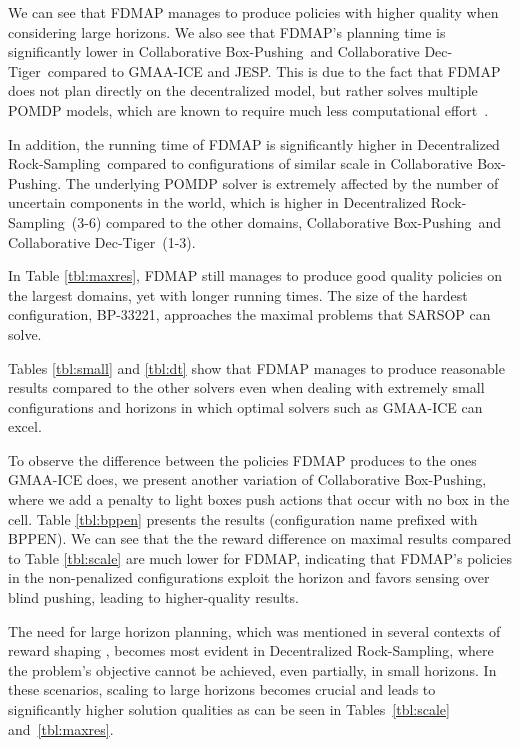 \documentclass[letterpaper]{article}
\theoremstyle{definition}
\newcommand{\eliran}[1]{\textbf{[\color{red}ELIRAN:#1]}}
\newcommand{\ronen}[1]{\textbf{[\color{blue}RONEN:#1]}}
\newcommand{\cbp}[0]{Collaborative Box-Pushing}
\newcommand{\cdt}[0]{Collaborative Dec-Tiger}
\newcommand{\drs}[0]{Decentralized Rock-Sampling}
\begin{document}
We can see that FDMAP manages to produce policies with higher quality when considering large horizons. We also see that FDMAP's planning time is
significantly lower in \cbp\ and \cdt\ compared to GMAA-ICE and JESP.  This is due to the fact that FDMAP does not plan directly on the decentralized model, but rather solves multiple POMDP models, which are known to require much less computational effort~\cite{DECPOMDPCOMP}.

In addition, the running time of FDMAP is significantly higher in \drs\ compared to configurations of similar scale in \cbp. The underlying POMDP solver is extremely affected by the number of uncertain components in the world, which is higher in \drs~(3-6) compared to the other domains, \cbp\ and \cdt~(1-3).


In Table \ref{tbl:maxres}, FDMAP still manages to produce good quality policies on the largest domains, yet with longer running times. The size of the hardest configuration, BP-33221, approaches the maximal problems that SARSOP \cite{SARSOP} can solve.

Tables \ref{tbl:small} and \ref{tbl:dt} show that FDMAP manages to produce reasonable results compared to the other solvers even when dealing with extremely small configurations and horizons in which optimal solvers such as GMAA-ICE can excel.

To observe the difference between the policies FDMAP produces to the ones GMAA-ICE does, we present another variation of \cbp, where we add a penalty to light boxes push actions that occur with no box in the cell. Table \ref{tbl:bppen} presents the results (configuration name prefixed with BPPEN). We can see that the the reward difference on maximal results compared to Table \ref{tbl:scale} are much lower for FDMAP, indicating that FDMAP's policies in the non-penalized configurations exploit the horizon and favors sensing over blind pushing, leading to higher-quality results.

The need for large horizon planning, which was mentioned in several contexts of reward shaping \cite{REWARDSHAPING,REWARDSHAPING2}, becomes most evident in \drs, where the problem's objective cannot be achieved, even partially, in small horizons.
In these scenarios, scaling to large horizons becomes crucial and leads to significantly higher solution qualities as can be seen in Tables~\ref{tbl:scale} and~\ref{tbl:maxres}.
\end{document}
